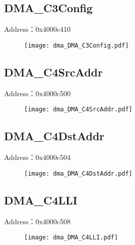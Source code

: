 \subsection{DMA\_C3Config}
\label{dma-DMA-C3Config}
Address：0x4000c410
 \begin{figure}[H]
\texttt{[image: dma\_DMA\_C3Config.pdf]}
\end{figure}

\subsection{DMA\_C4SrcAddr}
\label{dma-DMA-C4SrcAddr}
Address：0x4000c500
 \begin{figure}[H]
\texttt{[image: dma\_DMA\_C4SrcAddr.pdf]}
\end{figure}

\subsection{DMA\_C4DstAddr}
\label{dma-DMA-C4DstAddr}
Address：0x4000c504
 \begin{figure}[H]
\texttt{[image: dma\_DMA\_C4DstAddr.pdf]}
\end{figure}

\subsection{DMA\_C4LLI}
\label{dma-DMA-C4LLI}
Address：0x4000c508
 \begin{figure}[H]
\texttt{[image: dma\_DMA\_C4LLI.pdf]}
\end{figure}

